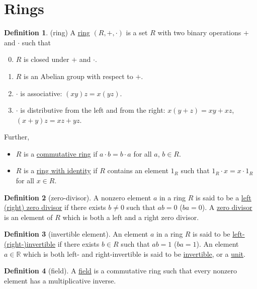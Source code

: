 \documentclass[a4paper]{report}
\newcommand{\R}{\mathbb{R}}
\newcommand{\defn}[1]{\ul{#1}}
\theoremstyle{definition}
\newtheorem{definition}{Definition}[section]
\theoremstyle{plain}
\theoremstyle{remark}
\begin{document}
\section{Rings}

\begin{definition}(ring)
  \label{def:ring}
  A \defn{ring} $(R, +, \cdot )$ is a set $R$ with two binary operations $+$ and $\cdot $ such that
  \begin{enumerate}
      \setcounter{enumi}{-1}
    \item $R$ is closed under $+$ and $\cdot$.
    \item $R$ is an Abelian group with respect to $+$.
    \item $\cdot$ is associative: $(xy)z = x(yz)$.
    \item $\cdot$ is distributive from the left and from the right: $x(y+z) = xy + xz$, $(x+y)z = xz + yz$.
  \end{enumerate}

  Further,
  \begin{itemize}
    \item $R$ is a \defn{commutative ring} if $a\cdot b = b \cdot a$ for all $a$, $b \in R$.
    \item $R$ is a \defn{ring with identity} if $R$ contains an element $1_{R}$ such that $1_{R}\cdot  x = x\cdot 1_{R}$ for all $x \in R$.
  \end{itemize}
\end{definition}

\begin{definition}[zero-divisor]
  \label{def:zerodivisor}
  A nonzero element $a$ in a ring $R$ is said to be a \defn{left (right) zero divisor} if there exists $b \neq 0$ such that $ab=0$ ($ba=0$). A \defn{zero divisor} is an element of $R$ which is both a left and a right zero divisor.
\end{definition}

\begin{definition}[invertible element]
  \label{def:ringinvertible}
  An element $a$ in a ring $R$ is said to be \defn{left- (right-)invertible} if there exists $b \in R$ such that $ab=1$ ($ba=1$). An element $a \in \R$ which is both left- and right-invertible is said to be \defn{invertible}, or a \defn{unit}.
\end{definition}

\begin{definition}[field]
  \label{def:field}
  A \defn{field} is a commutative ring such that every nonzero element has a multiplicative inverse.
\end{definition}
\end{document}
